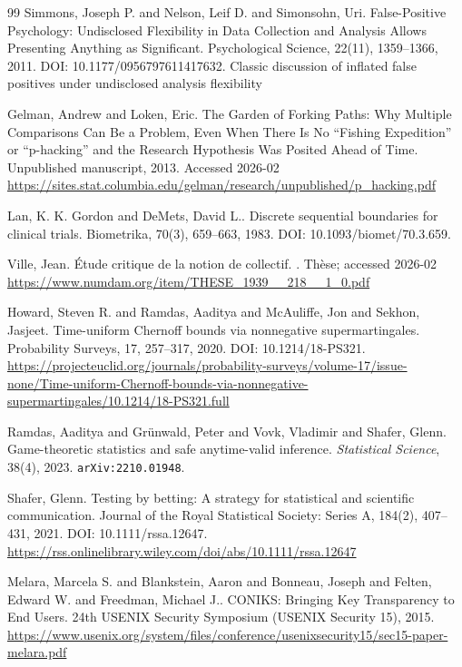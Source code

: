 \documentclass[11pt]{article}
\begin{document}
\begin{thebibliography}{99}
Simmons, Joseph P. and Nelson, Leif D. and Simonsohn, Uri.
\newblock False-Positive Psychology: Undisclosed Flexibility in Data Collection and Analysis Allows Presenting Anything as Significant.
\newblock Psychological Science, 22(11), 1359--1366, 2011.
\newblock DOI: 10.1177/0956797611417632.
\newblock Classic discussion of inflated false positives under undisclosed analysis flexibility

Gelman, Andrew and Loken, Eric.
\newblock The Garden of Forking Paths: Why Multiple Comparisons Can Be a Problem, Even When There Is No ``Fishing Expedition'' or ``p-hacking'' and the Research Hypothesis Was Posited Ahead of Time.
\newblock Unpublished manuscript, 2013.
\newblock Accessed 2026-02
\newblock \url{https://sites.stat.columbia.edu/gelman/research/unpublished/p_hacking.pdf}

Lan, K. K. Gordon and DeMets, David L..
\newblock Discrete sequential boundaries for clinical trials.
\newblock Biometrika, 70(3), 659--663, 1983.
\newblock DOI: 10.1093/biomet/70.3.659.

Ville, Jean.
\newblock \'{E}tude critique de la notion de collectif.
.
\newblock Th\`ese; accessed 2026-02
\newblock \url{https://www.numdam.org/item/THESE_1939__218__1_0.pdf}

Howard, Steven R. and Ramdas, Aaditya and McAuliffe, Jon and Sekhon, Jasjeet.
\newblock Time-uniform Chernoff bounds via nonnegative supermartingales.
\newblock Probability Surveys, 17, 257--317, 2020.
\newblock DOI: 10.1214/18-PS321.
\newblock \url{https://projecteuclid.org/journals/probability-surveys/volume-17/issue-none/Time-uniform-Chernoff-bounds-via-nonnegative-supermartingales/10.1214/18-PS321.full}


Ramdas, Aaditya and Gr\"unwald, Peter and Vovk, Vladimir and Shafer, Glenn.
\newblock Game-theoretic statistics and safe anytime-valid inference.
\newblock \emph{Statistical Science}, 38(4), 2023.
\newblock \texttt{arXiv:2210.01948}.

Shafer, Glenn.
\newblock Testing by betting: A strategy for statistical and scientific communication.
\newblock Journal of the Royal Statistical Society: Series A, 184(2), 407--431, 2021.
\newblock DOI: 10.1111/rssa.12647.
\newblock \url{https://rss.onlinelibrary.wiley.com/doi/abs/10.1111/rssa.12647}

Melara, Marcela S. and Blankstein, Aaron and Bonneau, Joseph and Felten, Edward W. and Freedman, Michael J..
\newblock CONIKS: Bringing Key Transparency to End Users.
\newblock 24th USENIX Security Symposium (USENIX Security 15), 2015.
\newblock \url{https://www.usenix.org/system/files/conference/usenixsecurity15/sec15-paper-melara.pdf}


\end{thebibliography}
\end{document}
